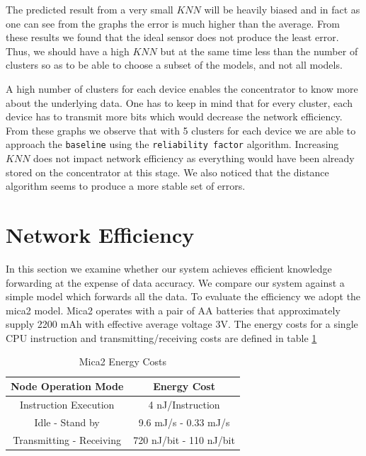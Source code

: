\documentclass{mproj}
\begin{document}
The predicted result from a very small $KNN$ will be heavily biased and in fact as one can see from the graphs the error is much higher than the average. From these results we found that the ideal sensor does not produce the least error. Thus, we should have a high $KNN$ but at the same time less than the number of clusters so as to be able to choose a subset of the models, and not all models.

A high number of clusters for each device enables the concentrator to know more about the underlying data. One has to keep in mind that for every cluster, each device has to transmit more bits which would decrease the network efficiency. From these graphs we observe that with 5 clusters for each device we are able to approach the \texttt{baseline} using the \texttt{reliability factor} algorithm. Increasing $KNN$ does not impact network efficiency as everything would have been already stored on the concentrator at this stage. We also noticed that the distance algorithm seems to produce a more stable set of errors.

\section{Network Efficiency}
\label{sec:networkefficiency}
In this section we examine whether our system achieves efficient knowledge forwarding at the expense of data accuracy. We compare our system against a simple model which forwards all the data. To evaluate the efficiency we adopt the mica2 \cite{mica2} model. Mica2 operates with a pair of AA batteries that approximately supply 2200 mAh with effective average voltage 3V. The energy costs for a single CPU instruction and transmitting/receiving costs are defined in table \ref{table:energy}

 \begin{table}[!ht]
 \centering
 \begin{tabular}{||c | c||}
 \hline
 Node Operation Mode & Energy Cost \\
 \hline\hline
 Instruction Execution & 4 nJ/Instruction \\ 
 \hline
 Idle - Stand by & 9.6 mJ/s - 0.33 mJ/s\\
 \hline
 Transmitting - Receiving & 720 nJ/bit - 110 nJ/bit\\
 \hline
\end{tabular}
\caption{Mica2 Energy Costs}
 \label{table:energy} 
\end{table}
\end{document}
